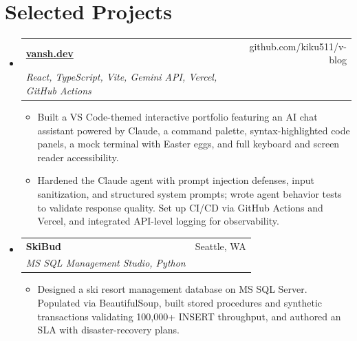 \documentclass[letterpaper,10pt]{article}
\makeatletter
\newcommand{\resumeItem}[2]{
  \item\small{
    \textbf{#1}{#2 \vspace{-2pt}}
  }
}
\newcommand{\resumeSubheading}[4]{
  \vspace{-1pt}\item
    \begin{tabular*}{0.97\textwidth}{l@{\extracolsep{\fill}}r}
      \textbf{#1} & #2 \\
      \textit{\small#3} & \textit{\small #4} \\
    \end{tabular*}\vspace{-5pt}
}
\newcommand{\resumeSubHeadingListStart}{\begin{itemize}[leftmargin=*]}
\newcommand{\resumeSubHeadingListEnd}{\end{itemize}}
\newcommand{\resumeItemListStart}{\begin{itemize}}
\newcommand{\resumeItemListEnd}{\end{itemize}\vspace{-5pt}}
\makeatother
\begin{document}
\section{Selected Projects}
  \resumeSubHeadingListStart
    \resumeSubheading
      {\href{https://vansh.dev}{vansh.dev}}{github.com/kiku511/v-blog}
      {React, TypeScript, Vite, Gemini API, Vercel, GitHub Actions}{}
      \resumeItemListStart
        \resumeItem{}{Built a VS Code-themed interactive portfolio featuring an AI chat assistant powered by Claude, a command palette, syntax-highlighted code panels, a mock terminal with Easter eggs, and full keyboard and screen reader accessibility.}
        \resumeItem{}{Hardened the Claude agent with prompt injection defenses, input sanitization, and structured system prompts; wrote agent behavior tests to validate response quality. Set up CI/CD via GitHub Actions and Vercel, and integrated API-level logging for observability.}
      \resumeItemListEnd

    \resumeSubheading
      {SkiBud}{Seattle, WA}
      {MS SQL Management Studio, Python}{}
      \resumeItemListStart
        \resumeItem{}{Designed a ski resort management database on MS SQL Server. Populated via BeautifulSoup, built stored procedures and synthetic transactions validating 100,000+ INSERT throughput, and authored an SLA with disaster-recovery plans.}
      \resumeItemListEnd

  \resumeSubHeadingListEnd

\end{document}
